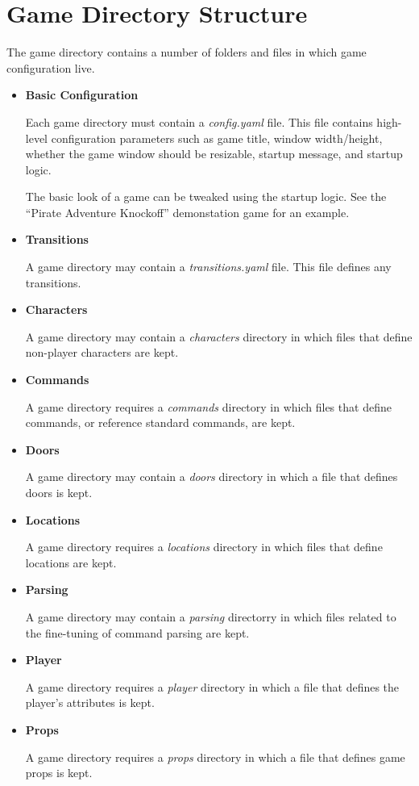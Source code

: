 \documentclass[letterpaper,10pt,english]{manual}
\begin{document}
\section{Game Directory Structure}

The game directory contains a number of folders and files in which game configuration live.
\begin{itemize}
\item {} 
\textbf{Basic Configuration}

Each game directory must contain a \emph{config.yaml} file. This file contains high-level configuration parameters such as game title, window width/height, whether the game window should be resizable, startup message, and startup logic.

The basic look of a game can be tweaked using the startup logic. See the ``Pirate Adventure Knockoff'' demonstation game for an example.

\item {} 
\textbf{Transitions}

A game directory may contain a \emph{transitions.yaml} file. This file defines any transitions.

\item {} 
\textbf{Characters}

A game directory may contain a \emph{characters} directory in which files that define non-player characters are kept.

\item {} 
\textbf{Commands}

A game directory requires a \emph{commands} directory in which files that define commands, or reference standard commands, are kept.

\item {} 
\textbf{Doors}

A game directory may contain a \emph{doors} directory in which a file that defines doors is kept.

\item {} 
\textbf{Locations}

A game directory requires a \emph{locations} directory in which files that define locations are kept.

\item {} 
\textbf{Parsing}

A game directory may contain a \emph{parsing} directorry in which files related to the fine-tuning of command parsing are kept.

\item {} 
\textbf{Player}

A game directory requires a \emph{player} directory in which a file that defines the player's attributes is kept.

\item {} 
\textbf{Props}

A game directory requires a \emph{props} directory in which a file that defines game props is kept.

\end{itemize}
\end{document}
